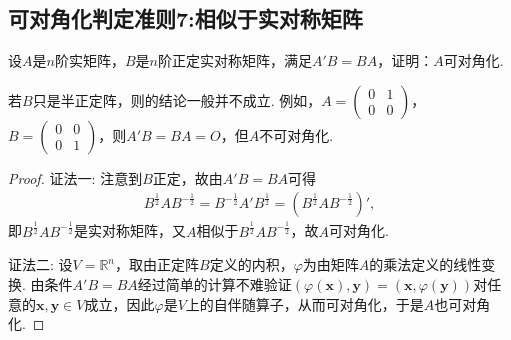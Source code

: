 \documentclass[../../main.tex]{subfiles}
\begin{document}
\subsection{可对角化判定准则7:相似于实对称矩阵}

\begin{proposition}\label{proposition:例9.72}
设\(A\)是\(n\)阶实矩阵，\(B\)是\(n\)阶正定实对称矩阵，满足\(A'B = BA\)，证明：\(A\)可对角化.
\end{proposition}
\begin{remark}
若\(B\)只是半正定阵，则的结论一般并不成立. 例如，\(A=\begin{pmatrix}0&1\\0&0\end{pmatrix}\)，\(B=\begin{pmatrix}0&0\\0&1\end{pmatrix}\)，则\(A'B = BA = O\)，但\(A\)不可对角化. 
\end{remark}
\begin{proof}
{\color{blue}证法一:}
注意到\(B\)正定，故由\(A'B = BA\)可得
\begin{align*}
B^{\frac{1}{2}}AB^{-\frac{1}{2}}=B^{-\frac{1}{2}}A'B^{\frac{1}{2}}=(B^{\frac{1}{2}}AB^{-\frac{1}{2}})',
\end{align*}
即\(B^{\frac{1}{2}}AB^{-\frac{1}{2}}\)是实对称矩阵，又\(A\)相似于\(B^{\frac{1}{2}}AB^{-\frac{1}{2}}\)，故\(A\)可对角化.

{\color{blue}证法二:}
设\(V = \mathbb{R}^n\)，取由正定阵\(B\)定义的内积，\(\varphi\)为由矩阵\(A\)的乘法定义的线性变换. 由条件\(A'B = BA\)经过简单的计算不难验证\((\varphi(\boldsymbol{x}),\boldsymbol{y}) = (\boldsymbol{x},\varphi(\boldsymbol{y}))\)对任意的\(\boldsymbol{x},\boldsymbol{y}\in V\)成立，因此\(\varphi\)是\(V\)上的自伴随算子，从而可对角化，于是\(A\)也可对角化.

\end{proof}
\end{document}
